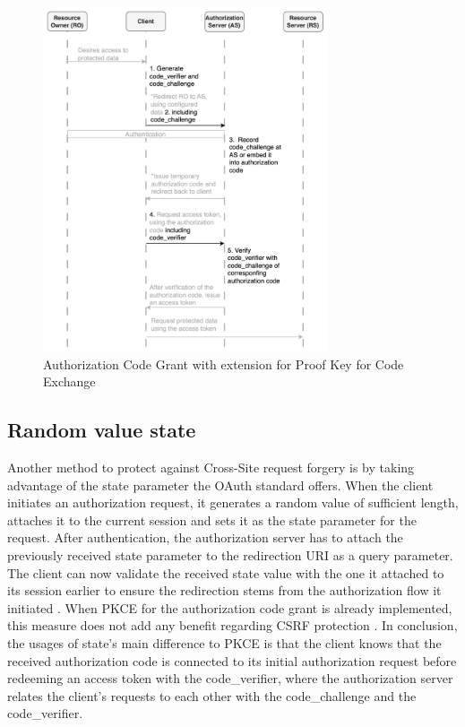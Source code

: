 \documentclass[
    fontsize=12pt,
    headings=small,
    parskip=half,           %
    bibliography=totoc,
    numbers=noenddot,       %
    open=any,               %
    ]{scrreprt}
\begin{document}
\begin{figure}[ht]
	\sffamily\footnotesize
	\includegraphics[width=0.75\textwidth]{pic/PKCE.png}
	\unitlength=0.75mm
	\linethickness{0.4pt}
	\caption{Authorization Code Grant with extension for Proof Key for Code Exchange}
	\label{fig:pkce}
\end{figure}

\subsection{Random value state}
\label{sec:countermeasure:state}
Another method to protect against Cross-Site request forgery is by taking advantage of the state parameter the OAuth standard offers. When the client initiates an authorization request, it generates a random value of sufficient length, attaches it to the current session and sets it as the state parameter for the request. After authentication, the authorization server has to attach the previously received state parameter to the redirection URI as a query parameter. The client can now validate the received state value with the one it attached to its session earlier to ensure the redirection stems from the authorization flow it initiated \cite{ferry2015security}. When PKCE for the authorization code grant is already implemented, this measure does not add any benefit regarding CSRF protection \cite{bradley2015rfc}. In conclusion, the usages of state's main difference to PKCE is that the client knows that the received authorization code is connected to its initial authorization request before redeeming an access token with the code\_verifier, where the authorization server relates the client's requests to each other with the code\_challenge and the code\_verifier.
\end{document}
